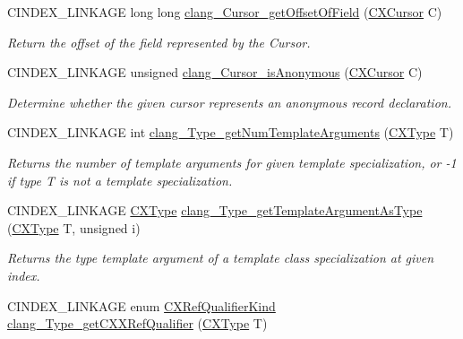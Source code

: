 \begin{DoxyCompactItemize}
C\+I\+N\+D\+E\+X\+\_\+\+L\+I\+N\+K\+A\+GE long long \hyperlink{group__CINDEX__TYPES_gaa7e0f0ec320c645e971168ac39aa0cab}{clang\+\_\+\+Cursor\+\_\+get\+Offset\+Of\+Field} (\hyperlink{structCXCursor}{C\+X\+Cursor} C)
\begin{DoxyCompactList}\small\item\em Return the offset of the field represented by the Cursor. \end{DoxyCompactList}\item 
\mbox{\label{group__CINDEX__TYPES_ga6e0d2674d126fd43816ce3a80b592373}} 
C\+I\+N\+D\+E\+X\+\_\+\+L\+I\+N\+K\+A\+GE unsigned \hyperlink{group__CINDEX__TYPES_ga6e0d2674d126fd43816ce3a80b592373}{clang\+\_\+\+Cursor\+\_\+is\+Anonymous} (\hyperlink{structCXCursor}{C\+X\+Cursor} C)
\begin{DoxyCompactList}\small\item\em Determine whether the given cursor represents an anonymous record declaration. \end{DoxyCompactList}\item 
\mbox{\label{group__CINDEX__TYPES_ga13f25981892e38c345d609b56ae1ee9c}} 
C\+I\+N\+D\+E\+X\+\_\+\+L\+I\+N\+K\+A\+GE int \hyperlink{group__CINDEX__TYPES_ga13f25981892e38c345d609b56ae1ee9c}{clang\+\_\+\+Type\+\_\+get\+Num\+Template\+Arguments} (\hyperlink{structCXType}{C\+X\+Type} T)
\begin{DoxyCompactList}\small\item\em Returns the number of template arguments for given template specialization, or -\/1 if type {\ttfamily T} is not a template specialization. \end{DoxyCompactList}\item 
C\+I\+N\+D\+E\+X\+\_\+\+L\+I\+N\+K\+A\+GE \hyperlink{structCXType}{C\+X\+Type} \hyperlink{group__CINDEX__TYPES_ga9645640281c8d088982b2133f58edcb3}{clang\+\_\+\+Type\+\_\+get\+Template\+Argument\+As\+Type} (\hyperlink{structCXType}{C\+X\+Type} T, unsigned i)
\begin{DoxyCompactList}\small\item\em Returns the type template argument of a template class specialization at given index. \end{DoxyCompactList}\item 
C\+I\+N\+D\+E\+X\+\_\+\+L\+I\+N\+K\+A\+GE enum \hyperlink{group__CINDEX__TYPES_ga28389bbe03a77eded92086f0011d86eb}{C\+X\+Ref\+Qualifier\+Kind} \hyperlink{group__CINDEX__TYPES_ga9eefb424da6ca291285dd50f82006b26}{clang\+\_\+\+Type\+\_\+get\+C\+X\+X\+Ref\+Qualifier} (\hyperlink{structCXType}{C\+X\+Type} T)

\end{DoxyCompactItemize}
